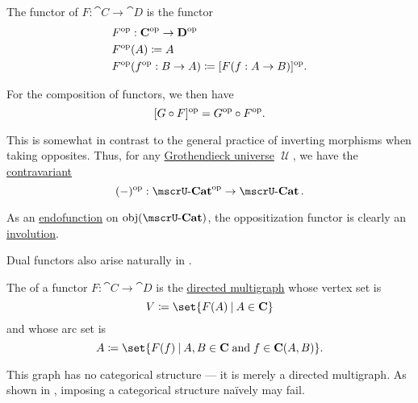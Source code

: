 \begin{definition}\label{def:opposite_functor}
  The  functor of \( F: \cat{C} \to \cat{D} \) is the functor
  \begin{equation*}
    \begin{aligned}
      &F^{\operatorname{op}}: \operatorname{\mathbf{C}}^{\operatorname{op}} \to \operatorname{\mathbf{D}}^{\operatorname{op}} \\
      &F^{\operatorname{op}}(A) \coloneqq A \\
      &F^{\operatorname{op}}(f^{\operatorname{op}}: B \to A) \coloneqq [F(f: A \to B)]^{\operatorname{op}}.
    \end{aligned}
  \end{equation*}

  For the composition of functors, we then have
  \begin{equation}\label{eq:def:opposite_functor/composition}
    [G \bincirc F]^{\opcat} = G^{\opcat} \bincirc F^{\opcat}.
  \end{equation}

  This is somewhat in contrast to the general practice of inverting morphisms when taking opposites. Thus, for any \hyperref[def:grothendieck_universe]{Grothendieck universe} \( \mscrU \), we have the \hyperref[rem:contravariant_functor]{contravariant} 
  \begin{equation*}
    (\anon*)^{\opcat}: \ucat{Cat}^{\opcat} \to \ucat{Cat}.
  \end{equation*}

  As an \hyperref[def:multi_valued_function/endofunction]{endofunction} on \( \obj(\ucat{Cat}) \), the oppositization functor is clearly an \hyperref[def:set_with_involution]{involution}.

  Dual functors also arise naturally in .
\end{definition}

\begin{definition}\label{def:functor_image}
  The  of a functor \( F: \cat{C} \to \cat{D} \) is the \hyperref[def:directed_multigraph]{directed multigraph} whose vertex set is
  \begin{equation*}
    V \coloneqq \set{ F(A) \given A \in \cat{C} }
  \end{equation*}
  and whose arc set is
  \begin{equation*}
    A \coloneqq \set{ F(f) \given A, B \in \cat{C} \T{and} f \in \cat{C}(A, B) }.
  \end{equation*}

  This graph has no categorical structure --- it is merely a directed multigraph. As shown in , imposing a categorical structure na\"ively may fail.
\end{definition}

